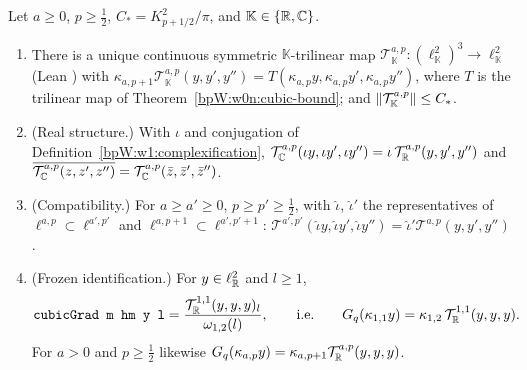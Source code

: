\begin{theorem}\label{bpW:w1:trilinear}
Let $a\ge0$, $p\ge\frac12$, $C_*=K_{p+1/2}^2/\pi$, and $\mathbb K\in\{\mathbb{R},\mathbb{C}\}$.
\begin{enumerate}[label=(\roman*)]
\item There is a unique continuous symmetric $\mathbb K$-trilinear map
  $\mathcal T^{a,p}_{\mathbb K}:(\ell^2_{\mathbb K})^3\to\ell^2_{\mathbb K}$ (Lean
  ) with
  $\kappa_{a,p+1}\mathcal T^{a,p}_{\mathbb K}(y,y',y'')=T(\kappa_{a,p}y,\kappa_{a,p}y',\kappa_{a,p}y'')$, where $T$ is
  the trilinear map of Theorem~\ref{bpW:w0n:cubic-bound}; and $\lVert \mathcal T^{a,p}_{\mathbb K}\rVert\le C_*$.
\item (Real structure.) With $\iota$ and conjugation of Definition~\ref{bpW:w1:complexification},
  $\mathcal T^{a,p}_{\mathbb{C}}(\iota y,\iota y',\iota y'')=\iota\,\mathcal T^{a,p}_{\mathbb{R}}(y,y',y'')$ and
  $\overline{\mathcal T^{a,p}_{\mathbb{C}}(z,z',z'')}=\mathcal T^{a,p}_{\mathbb{C}}(\bar z,\bar z',\bar z'')$.
\item (Compatibility.) For $a\ge a'\ge0$, $p\ge p'\ge\frac12$, with $\hat\iota$, $\hat\iota'$ the representatives of
  $\ell^{a,p}\subset\ell^{a',p'}$ and $\ell^{a,p+1}\subset\ell^{a',p'+1}$:
  $\mathcal T^{a',p'}(\hat\iota y,\hat\iota y',\hat\iota y'')=\hat\iota'\mathcal T^{a,p}(y,y',y'')$.
\item (Frozen identification.) For $y\in\ell^2_{\mathbb{R}}$ and $l\ge1$,
  \[\texttt{cubicGrad m hm y l}=\frac{\mathcal T^{1,1}_{\mathbb{R}}(y,y,y)_l}{\omega_{1,2}(l)},\qquad\text{i.e.}\qquad
  G_q(\kappa_{1,1}y)=\kappa_{1,2}\,\mathcal T^{1,1}_{\mathbb{R}}(y,y,y).\]
  For $a>0$ and $p\ge\frac12$ likewise $G_q(\kappa_{a,p}y)=\kappa_{a,p+1}\mathcal T^{a,p}_{\mathbb{R}}(y,y,y)$.
\end{enumerate}
\end{theorem}

